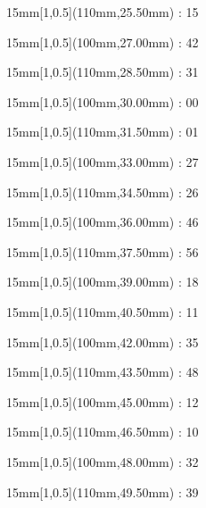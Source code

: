 \documentclass[a4paper]{memoir}
\begin{document}
\begin{textblock*}{15mm}[1,0.5](110mm,25.50mm) : 15\end{textblock*}
\begin{textblock*}{15mm}[1,0.5](100mm,27.00mm) : 42\end{textblock*}
\begin{textblock*}{15mm}[1,0.5](110mm,28.50mm) : 31\end{textblock*}
\begin{textblock*}{15mm}[1,0.5](100mm,30.00mm) : 00\end{textblock*}
\begin{textblock*}{15mm}[1,0.5](110mm,31.50mm) : 01\end{textblock*}
\begin{textblock*}{15mm}[1,0.5](100mm,33.00mm) : 27\end{textblock*}
\begin{textblock*}{15mm}[1,0.5](110mm,34.50mm) : 26\end{textblock*}
\begin{textblock*}{15mm}[1,0.5](100mm,36.00mm) : 46\end{textblock*}
\begin{textblock*}{15mm}[1,0.5](110mm,37.50mm) : 56\end{textblock*}
\begin{textblock*}{15mm}[1,0.5](100mm,39.00mm) : 18\end{textblock*}
\begin{textblock*}{15mm}[1,0.5](110mm,40.50mm) : 11\end{textblock*}
\begin{textblock*}{15mm}[1,0.5](100mm,42.00mm) : 35\end{textblock*}
\begin{textblock*}{15mm}[1,0.5](110mm,43.50mm) : 48\end{textblock*}
\begin{textblock*}{15mm}[1,0.5](100mm,45.00mm) : 12\end{textblock*}
\begin{textblock*}{15mm}[1,0.5](110mm,46.50mm) : 10\end{textblock*}
\begin{textblock*}{15mm}[1,0.5](100mm,48.00mm) : 32\end{textblock*}
\begin{textblock*}{15mm}[1,0.5](110mm,49.50mm) : 39\end{textblock*}
\end{document}
